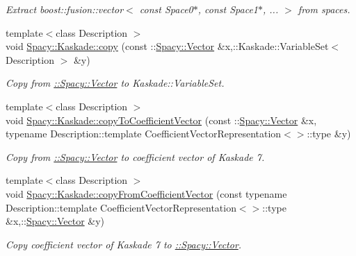 \begin{DoxyCompactItemize}
\begin{DoxyCompactList}\small\item\em Extract boost\+::fusion\+::vector$<$ const Space0$\ast$, const Space1$\ast$, ... $>$ from spaces. \end{DoxyCompactList}\item 
{\footnotesize template$<$class Description $>$ }\\void \hyperlink{group__KaskadeGroup_gafbbd7e385eda54f651c45b1c074d7bf9_gafbbd7e385eda54f651c45b1c074d7bf9}{Spacy\+::\+Kaskade\+::copy} (const \+::\hyperlink{classSpacy_1_1Vector}{Spacy\+::\+Vector} \&x,\+::Kaskade\+::\+Variable\+Set$<$ Description $>$ \&y)
\begin{DoxyCompactList}\small\item\em Copy from \hyperlink{group__SpacyGroup_gafc144d2730ef87a67e54f8cd750b1f54_VectorAnchor}{\+:\+:Spacy\+:\+:Vector} to Kaskade\+::\+Variable\+Set. \end{DoxyCompactList}\item 
{\footnotesize template$<$class Description $>$ }\\void \hyperlink{group__KaskadeGroup_ga4d7422b0c155f9622e54b9d3503d82d8_ga4d7422b0c155f9622e54b9d3503d82d8}{Spacy\+::\+Kaskade\+::copy\+To\+Coefficient\+Vector} (const \+::\hyperlink{classSpacy_1_1Vector}{Spacy\+::\+Vector} \&x, typename Description\+::template Coefficient\+Vector\+Representation$<$$>$\+::type \&y)
\begin{DoxyCompactList}\small\item\em Copy from \hyperlink{group__SpacyGroup_gafc144d2730ef87a67e54f8cd750b1f54_VectorAnchor}{\+:\+:Spacy\+:\+:Vector} to coefficient vector of Kaskade 7. \end{DoxyCompactList}\item 
{\footnotesize template$<$class Description $>$ }\\void \hyperlink{group__KaskadeGroup_ga75249db31f75e23a474c4a9a5b792d67_ga75249db31f75e23a474c4a9a5b792d67}{Spacy\+::\+Kaskade\+::copy\+From\+Coefficient\+Vector} (const typename Description\+::template Coefficient\+Vector\+Representation$<$$>$\+::type \&x,\+::\hyperlink{classSpacy_1_1Vector}{Spacy\+::\+Vector} \&y)
\begin{DoxyCompactList}\small\item\em Copy coefficient vector of Kaskade 7 to \hyperlink{group__SpacyGroup_gafc144d2730ef87a67e54f8cd750b1f54_VectorAnchor}{\+:\+:Spacy\+:\+:Vector}. \end{DoxyCompactList}\item 

\end{DoxyCompactItemize}
